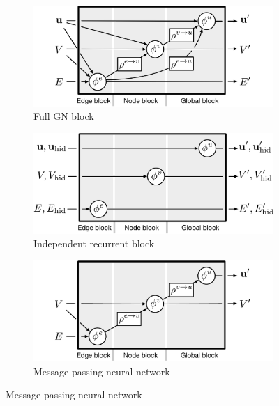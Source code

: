 \begin{figure}[t!]
    \centering
    \begin{subfigure}[b]{0.49\textwidth}
        \includegraphics[width=\textwidth]{figures/GN-full-block.png}
        \caption{Full GN block}
        \label{fig:gn-full-block}
    \end{subfigure}
    \hspace{0.2em}
    \begin{subfigure}[b]{0.49\textwidth}
        \includegraphics[width=\textwidth]{figures/GN-recurrent-block}
        \caption{Independent recurrent block}
        \label{fig:gn-recur-block}
    \end{subfigure}
    \par\bigskip
    \begin{subfigure}[b]{0.49\textwidth}
        \includegraphics[width=\textwidth]{figures/GN-mpnn-block}
        \caption{Message-passing neural network}

\end{subfigure}
\end{figure}
